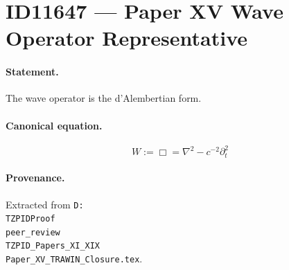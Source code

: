 \section*{ID11647 --- Paper XV Wave Operator Representative}

\paragraph{Statement.}
The wave operator is the d'Alembertian form.

\paragraph{Canonical equation.}
\[
W:=\Box=\nabla^2-c^{-2}\partial_t^2
\]

\paragraph{Provenance.}
Extracted from \texttt{D:\\TZPIDProof\\peer\_review\\TZPID\_Papers\_XI\_XIX\\Paper\_XV\_TRAWIN\_Closure.tex}.
